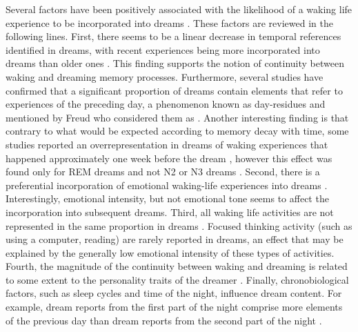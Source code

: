 Several factors have been positively associated with the likelihood of a waking life experience to be incorporated into dreams \citep{schredl_characteristics_2010}. These factors are reviewed in the following lines. First, there seems to be a linear decrease in temporal references identified in dreams, with recent experiences being more incorporated into dreams than older ones \citep{botman_dream_1990, strauch_dem_2004, grenier_temporal_2005}. This finding supports the notion of continuity between waking and dreaming memory processes. Furthermore, several studies \citep{botman_dream_1990, nielsen_day-residue_1992, marquardt_empirical_1996} have confirmed that a significant proportion of dreams contain elements that refer to experiences of the preceding day, a phenomenon known as day-residues and mentioned by Freud who considered them as  \citep{freud_interpretation_1900}. Another interesting finding is that contrary to what would be expected according to memory decay with time, some studies reported an overrepresentation in dreams of waking experiences that happened approximately one week before the dream \citep{nielsen_day-residue_1992, marquardt_empirical_1996}, however this effect was found only for REM dreams and not N2 or N3 dreams \citep{blagrove_assessing_2011, van_rijn_dream-lag_2015}. Second, there is a preferential incorporation of emotional waking-life experiences into dreams \citep{malinowski_evidence_2014, schredl_factors_2006}. Interestingly, emotional intensity, but not emotional tone seems to affect the incorporation into subsequent dreams. Third, all waking life activities are not represented in the same proportion in dreams \citep{hartmann_we_1996, schredl_continuity_2000}. Focused thinking activity (such as using a computer, reading) are rarely reported in dreams, an effect that may be explained by the generally low emotional intensity of these types of activities. Fourth, the magnitude of the continuity between waking and dreaming is related to some extent to the personality traits of the dreamer \citep{schredl_dreaming_1996}. Finally, chronobiological factors, such as sleep cycles and time of the night, influence dream content. For example, dream reports from the first part of the night comprise more elements of the previous day than dream reports from the second part of the night \citep{roffwarg_effects_1978}.

